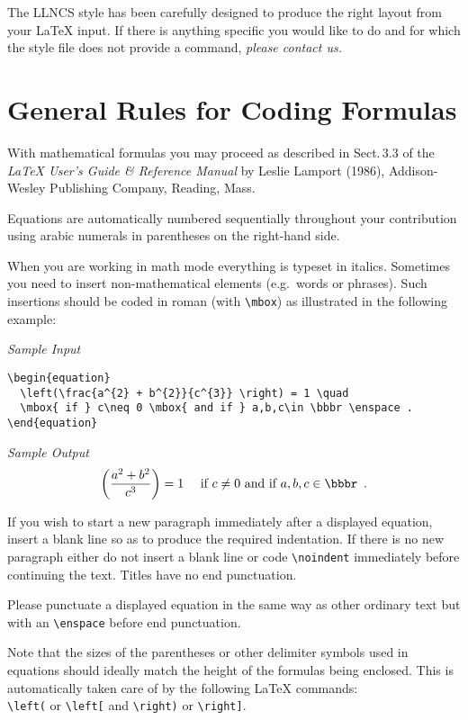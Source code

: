 The LLNCS style has been carefully designed to produce the right layout
from your \LaTeX{} input. If there is anything specific you would like
to do and  for which the style file does not provide a command,
{\em please contact us.\/}
%
\section{General Rules for Coding Formulas}
%
With mathematical formulas you may proceed as described
in Sect.\,3.3 of the {\em \LaTeX{} User's Guide \& Reference
Manual\/} by Leslie Lamport (1986), Addison-Wesley Publishing
Company, Reading, Mass.

Equations are automatically numbered sequentially throughout your
contribution using arabic numerals in parentheses on the right-hand
side.

When you are working in math mode everything is typeset in italics.
Sometimes you need to insert non-mathematical elements (e.g.\
words or phrases). Such insertions should be coded in  roman
(with \verb|\mbox|) as illustrated in the following example:
\begin{flushleft}
{\it Sample Input}
\end{flushleft}
\begin{verbatim}
\begin{equation}
  \left(\frac{a^{2} + b^{2}}{c^{3}} \right) = 1 \quad
  \mbox{ if } c\neq 0 \mbox{ and if } a,b,c\in \bbbr \enspace .
\end{equation}
\end{verbatim}
{\it Sample Output}
\begin{equation}
  \left(\frac{a^{2} + b^{2}}{c^{3}} \right) = 1 \quad
  \mbox{ if } c\neq 0 \mbox{ and if } a,b,c\in \bbbr \enspace .
\end{equation}

If you wish to start a new paragraph immediately after a displayed
equation, insert a blank line so as to produce the required
indentation. If there is no new paragraph either do not insert
a blank line or code \verb|\noindent| immediately before
continuing the text. Titles have no end punctuation.

Please punctuate a displayed equation in the same way as other
ordinary  text but with an \verb|\enspace| before end punctuation.

Note that the sizes of the parentheses or other delimiter
symbols used in equations should ideally match the height of the
formulas being enclosed. This is automatically taken care of by
the following \LaTeX{} commands:\\[2mm]
\verb|\left(| or \verb|\left[| and
\verb|\right)| or \verb|\right]|.
%
